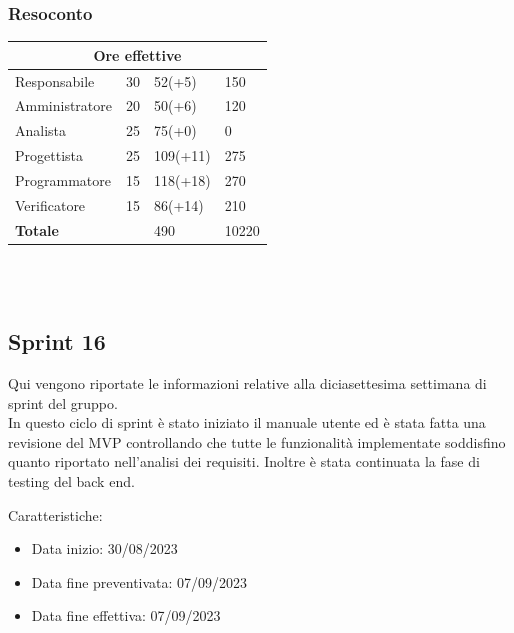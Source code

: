 \documentclass[9pt]{article}
\begin{document}
\subsubsection{Resoconto}
\begin{center}
	\begin{tabularx}{\textwidth}{|X|X|X|X|}
		\hline														
		\multicolumn{4}{|c|}{\textbf{Ore effettive}}                                      \\														
		\hline														
		Responsabile		&		30		&		52(+5)		&		150		\\
		\hline														
		Amministratore		&		20		&		50(+6)		&		120		\\
		\hline														
		Analista		&		25		&		75(+0)		&		0		\\
		\hline														
		Progettista		&		25		&		109(+11)		&		275		\\
		\hline														
		Programmatore		&		15		&		118(+18)		&		270		\\
		\hline														
		Verificatore		&		15		&		86(+14)		&		210		\\
		\hline														
		\hline														
		\textbf{Totale}		&				&		490		&		10220		\\
		\hline														
																																							
	\end{tabularx}\\[8pt]
	\mbox{}\\
\end{center}

\subsection{Sprint 16}
Qui vengono riportate le informazioni relative alla diciasettesima settimana di sprint del gruppo. \\
In questo ciclo di sprint è stato iniziato il manuale utente ed è stata fatta una revisione del MVP controllando che tutte le funzionalità implementate soddisfino quanto riportato nell'analisi dei requisiti.	 
Inoltre è stata continuata la fase di testing del back end.

Caratteristiche:

\begin{itemize}
	\item Data inizio: 30/08/2023
	\item Data fine preventivata: 07/09/2023
	\item Data fine effettiva: 07/09/2023
\end{itemize}
\end{document}
